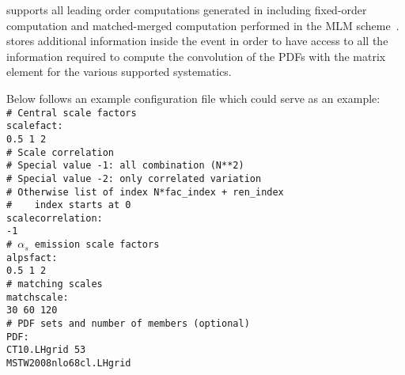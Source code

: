 \syscalc supports all leading order computations generated in \madgraph including fixed-order computation and matched-merged computation performed in the MLM scheme~\cite{Mangano:2006rw}.
\madgraph stores additional information inside the event in order to have access to all the information required to compute the convolution of the PDFs with the matrix element for the various supported systematics.

Below follows an example configuration file which could serve as an example:\\[2mm]

{\footnotesize
\texttt{\# Central scale factors \\
scalefact: \\
0.5 1 2\\
\# Scale correlation \\
\# Special value -1: all combination (N**2)\\
\# Special value -2: only correlated variation\\
\# Otherwise list of index N*fac\_index + ren\_index\\
\#\ \ \ \ index starts at 0\\
scalecorrelation: \\
-1 \\
\#   $\alpha_s$ emission scale factors \\
alpsfact:\\
0.5 1 2\\
\#   matching scales\\
matchscale:\\
30 60 120\\
\# PDF sets and number of members (optional)\\
PDF:\\
CT10.LHgrid 53\\
MSTW2008nlo68cl.LHgrid\\[3mm]}
}


